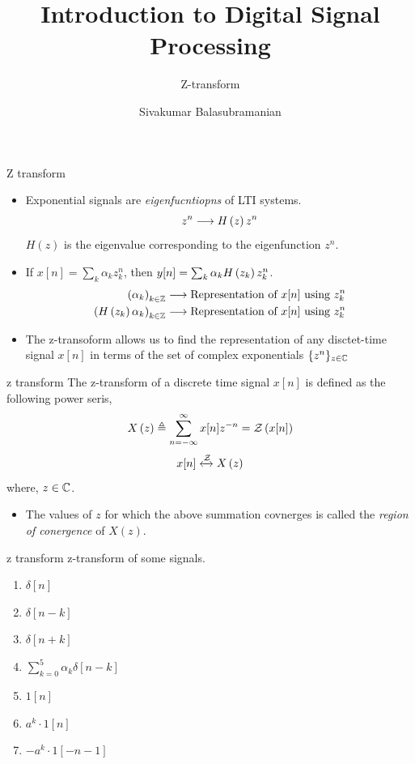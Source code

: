 \documentclass[aspectratio=169]{beamer}
\title{Introduction to Digital Signal Processing}
\subtitle{Z-transform}
\author{Sivakumar Balasubramanian}
\institute[Christian Medical College] %
{
  \inst{}%
  Department of Bioengineering\\
  Christian Medical College, Bagayam\\
  Vellore 632002
}
\date{}
\let\olditem\item
\renewcommand{\item}{\setlength{\itemsep}{\fill}\olditem}
\def\mb{\ensuremath\mathbb}
\def\mc{\ensuremath\mathcal}
\def\lp{\ensuremath\left(}
\def\rp{\ensuremath\right)}
\begin{document}
\begin{frame}
  \titlepage
\end{frame}


\begin{frame}[t]{Z transform}
\begin{itemize}
  \item Exponential signals are \textit{eigenfucntiopns} of LTI systems.
  \[  z^n \longrightarrow H\lp z \rp z^n \]
  $H(z)$ is the eigenvalue corresponding to the eigenfunction $z^n$.

  \item If $x[n] = \sum_{k} \alpha_k z_k^n$, then $y[n] = \sum_{k} \alpha_k H\lp z_k \rp z_k^n$.
  \[ \begin{split}
      \lp \alpha_k \rp_{k \in \mb{Z}} & \longrightarrow \text{Representation of } x[n] \text{ using } z_k^n \\
      \lp H\lp z_k \rp \alpha_k \rp_{k \in \mb{Z}} & \longrightarrow \text{Representation of } x[n] \text{ using } z_k^n \\
      \end{split} \]

  \item The z-transoform allows us to find the representation of any disctet-time signal $x[n]$ in terms of the set of complex exponentials $\{ z^n \}_{z \in \mb{C}}$ 
\end{itemize}
\end{frame}


\begin{frame}[t]{z transform}
The z-transform of a discrete time signal $x[n]$ is defined as the following power seris,
\[ X\lp z \rp \triangleq \sum_{n=-\infty}^{\infty} x[n] z^{-n} = \mc{Z}\lp x[n] \rp\]
\[ x[n] \xleftrightarrow{\mc{Z}} X\lp z \rp  \]
where, $z \in \mb{C}$.

\begin{itemize}
  \item The values of $z$ for which the above summation covnerges is called the \textit{region of conergence} of $X(z)$.
\end{itemize}
\end{frame}


\begin{frame}[t]{z transform}
z-transform of some signals.
\begin{enumerate}
  \item $\delta[n]$
  \item $\delta[n-k]$
  \item $\delta[n+k]$
  \item $\sum_{k=0}^{5} \alpha_k \delta[n - k]$
  \item $1[n]$
  \item $a^k \cdot 1[n]$
  \item $-a^{k} \cdot 1[-n-1]$
\end{enumerate}
\end{frame}
\end{document}
